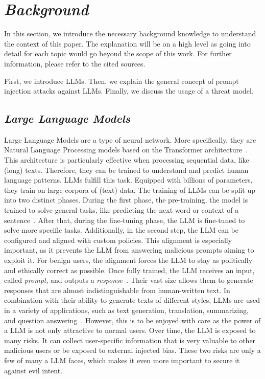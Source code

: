 \section{\textit{Background}}
In this section, we introduce the necessary background knowledge to understand the context of this paper. 
The explanation will be on a high level as going into detail for each topic would go beyond the scope of this work. 
For further information, please refer to the cited sources.

First, we introduce LLMs.
Then, we explain the general concept of prompt injection attacks against LLMs.
Finally, we discuss the usage of a threat model.
\subsection{\textit{Large Language Models}}
Large Language Models are a type of neural network.
More specifically, they are Natural Language Processing models based on the Transformer architecture~\cite{vaswani2023attention, floridi2020gpt, thoppilan2022lamda}.
This architecture is particularly effective when processing sequential data, like (long) texts. 
Therefore, they can be trained to understand and predict human language patterns.
LLMs fulfill this task. Equipped with billions of parameters, they train on large corpora of (text) data.
The training of LLMs can be split up into two distinct phases.
During the first phase, the pre-training, the model is trained to solve general tasks, like predicting the next word or context of a sentence~\cite{radford2018improving}.
After that, during the fine-tuning phase, the LLM is fine-tuned to solve more specific tasks. 
Additionally, in the second step, the LLM can be configured and aligned with custom policies. 
This alignment is especially important, as it prevents the LLM from answering malicious prompts aiming to exploit it. 
For benign users, the alignment forces the LLM to stay as politically and ethically correct as possible.
Once fully trained, the LLM receives an input, called \textit{prompt}, and outputs a \textit{response}~\cite{floridi2020gpt, thoppilan2022lamda}.
Their vast size allows them to generate responses that are almost indistinguishable from human-written text.
In combination with their ability to generate texts of different styles, LLMs are used in a variety of applications, such as text generation, translation, summarizing, and question answering~\cite{floridi2020gpt, thoppilan2022lamda}.
However, this is to be enjoyed with care as the power of a LLM is not only attractive to normal users. 
Over time, the LLM is exposed to many risks. It can collect user-specific information that is very valuable to other malicious users or be exposed to external injected bias.
These two risks are only a few of many a LLM faces, which makes it even more important to secure it against evil intent.

